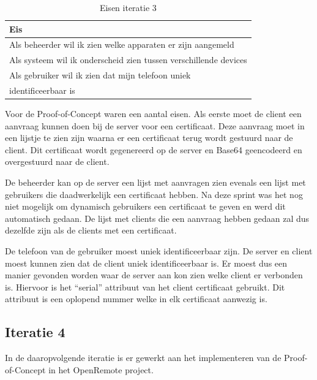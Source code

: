 \documentclass[]{article}
\begin{document}
\begin{table}[htpb]
  \caption{Eisen iteratie 3}
  \begin{center}
    \begin{tabular}{|| l ||}\hline
        Eis                                                              \\\hline\hline
        Als beheerder wil ik zien welke apparaten er zijn aangemeld      \\\hline
        Als systeem wil ik onderscheid zien tussen verschillende devices \\\hline
        Als gebruiker wil ik zien dat mijn telefoon uniek                \\ 
        identificeerbaar is                                              \\\hline
    \end{tabular}                                                         
  \end{center}                                                            
\end{table}                                                               

Voor de Proof-of-Concept waren een aantal eisen. Als eerste moet de client
een aanvraag kunnen doen bij de server voor een certificaat. Deze aanvraag
moet in een lijstje te zien zijn waarna er een certificaat terug wordt
gestuurd naar de client. Dit certificaat wordt gegenereerd op de server en
Base64 geencodeerd en overgestuurd naar de client.

De beheerder kan op de server een lijst met aanvragen zien evenals een
lijst met gebruikers die daadwerkelijk een certificaat hebben. Na deze
sprint was het nog niet mogelijk om dynamisch gebruikers een certificaat te
geven en werd dit automatisch gedaan. De lijst met clients die een aanvraag
hebben gedaan zal dus dezelfde zijn als de clients met een certificaat.

De telefoon van de gebruiker moest uniek identificeerbaar zijn. De server
en client moest kunnen zien dat de client uniek identificeerbaar is. Er
moest dus een manier gevonden worden waar de server aan kon zien welke
client er verbonden is. Hiervoor is het ``serial'' attribuut van het client
certificaat gebruikt. Dit attribuut is een oplopend nummer welke in elk
certificaat aanwezig is.

\subsection{Iteratie 4}
In de daaropvolgende iteratie is er gewerkt aan het implementeren van de
Proof-of-Concept in het OpenRemote project.
\end{document}
